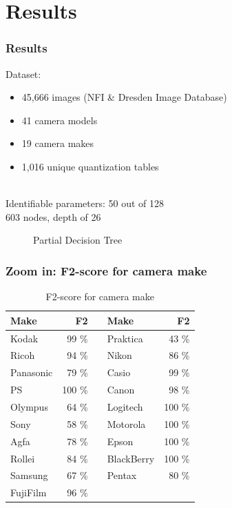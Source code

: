 \documentclass[10pt]{beamer}
\begin{document}
\section[Results]{Results}
\begin{frame}
\frametitle{Results}
Dataset:
\begin{itemize}
\item 45,666 images (NFI \& Dresden Image Database)
\item 41 camera models
\item 19 camera makes
\item 1,016 unique quantization tables
\end{itemize}
~\\Identifiable parameters: 50 out of 128 \\
603 nodes, depth of 26
\begin{figure}
   \caption{Partial Decision Tree}
\end{figure}
\end{frame}


\begin{frame}
\frametitle{Zoom in: F2-score for camera make}
\begin{table}
\begin{tabular}{| l | r | c | l | r |}
\hline
\textbf{Make} & \textbf{F2} &  & \textbf{Make} & \textbf{F2} \\
\hline
Kodak & 99 \% & & Praktica & 43 \% \\
Ricoh & 94 \% & & Nikon & 86 \% \\
Panasonic & 79 \% & & Casio & 99 \% \\
PS & 100 \% & & Canon & 98 \% \\
Olympus & 64 \% & & Logitech & 100 \%\\
Sony & 58 \% & & Motorola & 100 \% \\
Agfa & 78 \% & & Epson & 100 \% \\
Rollei & 84 \% & & BlackBerry & 100 \% \\
Samsung & 67 \% & & Pentax & 80 \% \\
FujiFilm & 96 \% & &  & \\
\hline
\end{tabular}
\caption{F2-score for camera make}
\end{table}

\end{frame}
\end{document}
